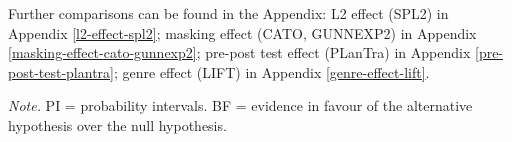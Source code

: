 \documentclass[
  english,
  man,floatsintext]{apa7}
\begin{document}
Further comparisons can be found in the Appendix: L2 effect (SPL2) in Appendix \ref{l2-effect-spl2}; masking effect (CATO, GUNNEXP2) in Appendix \ref{masking-effect-cato-gunnexp2}; pre-post test effect (PLanTra) in Appendix \ref{pre-post-test-plantra}; genre effect (LIFT) in Appendix \ref{genre-effect-lift}.

\begin{landscape}

\begin{center}
\begin{ThreePartTable}

\begin{TableNotes}[para]
\normalsize{\textit{Note.} PI = probability intervals. BF = evidence in favour of the alternative hypothesis over the null hypothesis.}
\end{TableNotes}

\footnotesize{

}
\end{ThreePartTable}
\end{center}
\end{landscape}
\end{document}
